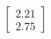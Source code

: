 \documentclass[preview]{standalone}
\begin{document}
\begin{align*}
\begin{bmatrix} 2.21 \\ 2.75 \end{bmatrix}
\end{align*}
\end{document}
